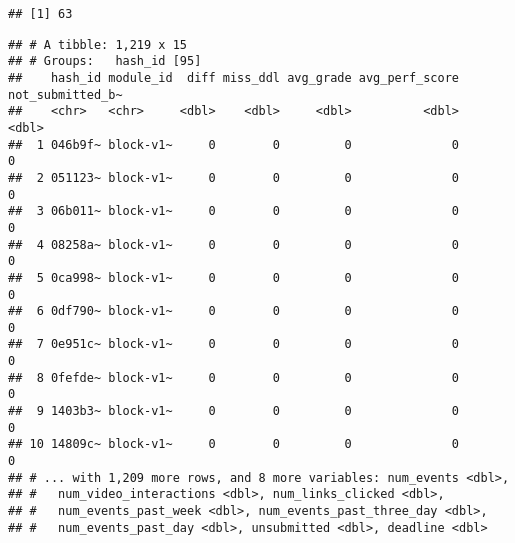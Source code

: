 \documentclass[
]{article}
\newenvironment{Shaded}{\begin{snugshade}}{\end{snugshade}}
\newcommand{\CommentTok}[1]{\textcolor[rgb]{0.56,0.35,0.01}{\textit{#1}}}
\newcommand{\ControlFlowTok}[1]{\textcolor[rgb]{0.13,0.29,0.53}{\textbf{#1}}}
\newcommand{\DecValTok}[1]{\textcolor[rgb]{0.00,0.00,0.81}{#1}}
\newcommand{\KeywordTok}[1]{\textcolor[rgb]{0.13,0.29,0.53}{\textbf{#1}}}
\newcommand{\NormalTok}[1]{#1}
\newcommand{\OperatorTok}[1]{\textcolor[rgb]{0.81,0.36,0.00}{\textbf{#1}}}
\newcommand{\StringTok}[1]{\textcolor[rgb]{0.31,0.60,0.02}{#1}}
\begin{document}
\begin{Shaded}
\end{Shaded}

\begin{verbatim}
## [1] 63
\end{verbatim}

\begin{Shaded}
\end{Shaded}

\begin{verbatim}
## # A tibble: 1,219 x 15
## # Groups:   hash_id [95]
##    hash_id module_id  diff miss_ddl avg_grade avg_perf_score not_submitted_b~
##    <chr>   <chr>     <dbl>    <dbl>     <dbl>          <dbl>            <dbl>
##  1 046b9f~ block-v1~     0        0         0              0                0
##  2 051123~ block-v1~     0        0         0              0                0
##  3 06b011~ block-v1~     0        0         0              0                0
##  4 08258a~ block-v1~     0        0         0              0                0
##  5 0ca998~ block-v1~     0        0         0              0                0
##  6 0df790~ block-v1~     0        0         0              0                0
##  7 0e951c~ block-v1~     0        0         0              0                0
##  8 0fefde~ block-v1~     0        0         0              0                0
##  9 1403b3~ block-v1~     0        0         0              0                0
## 10 14809c~ block-v1~     0        0         0              0                0
## # ... with 1,209 more rows, and 8 more variables: num_events <dbl>,
## #   num_video_interactions <dbl>, num_links_clicked <dbl>,
## #   num_events_past_week <dbl>, num_events_past_three_day <dbl>,
## #   num_events_past_day <dbl>, unsubmitted <dbl>, deadline <dbl>
\end{verbatim}
\end{document}
